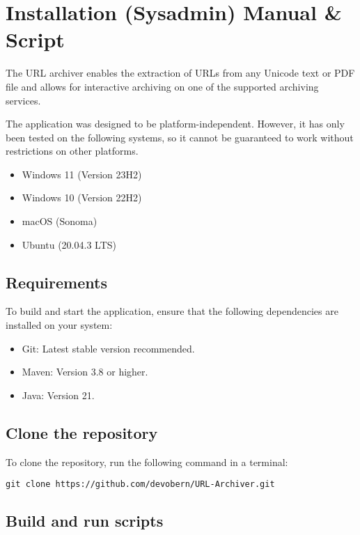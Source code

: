 
\section{Installation (Sysadmin) Manual \& Script} \label{sec::installation_manual}
The URL archiver enables the extraction of URLs from any Unicode text or PDF file and allows for interactive archiving
on one of the supported archiving services.
\begin{bfhWarnBox}
The application was designed to be platform-independent. However, it has only been tested on the following systems, so it cannot be guaranteed to work without restrictions on other platforms.
\begin{itemize}
	\item Windows 11 (Version 23H2)
	\item Windows 10 (Version 22H2)
	\item macOS (Sonoma)
	\item Ubuntu (20.04.3 LTS)
\end{itemize}
\end{bfhWarnBox}

\subsection{Requirements}

To build and start the application, ensure that the following dependencies are installed on your system:
\begin{itemize}
	\item Git: Latest stable version recommended.
	\item Maven: Version 3.8 or higher.
	\item Java: Version 21.
\end{itemize}

\subsection{Clone the repository}

To clone the repository, run the following command in a terminal:

\begin{lstlisting}[numbers=none]
git clone https://github.com/devobern/URL-Archiver.git
\end{lstlisting}

\subsection{Build and run scripts}

